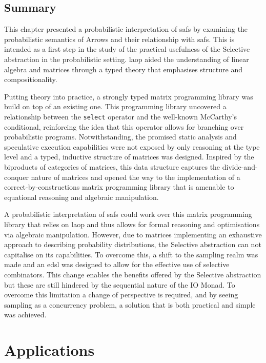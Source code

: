 \documentclass[
  oneside,
  11pt, a4paper,
  footinclude=true,
  headinclude=true,
  cleardoublepage=empty
]{scrbook}
\theoremstyle{definition}
\theoremstyle{definition}
\begin{document}
    \section{Summary}
    
    This chapter presented a probabilistic interpretation of \glspl{saf} by examining the probabilistic semantics of Arrows and their relationship with \glspl{saf}. This is intended as a first step in the study of the practical usefulness of the Selective abstraction in the probabilistic setting. \gls{laop} aided the understanding of linear algebra and matrices through a typed theory that emphasises structure and compositionality.
    
    Putting theory into practice, a strongly typed matrix programming library was build on top of an existing one. This programming library uncovered a relationship between the \texttt{select} operator and the well-known McCarthy's conditional, reinforcing the idea that this operator allows for branching over probabilistic programs. Notwithstanding, the promised static analysis and speculative execution capabilities were not exposed by only reasoning at the type level and a typed, inductive structure of matrices was designed. Inspired by the biproducts of categories of matrices, this data structure captures the divide-and-conquer nature of matrices and opened the way to the implementation of a correct-by-constructions matrix programming library that is amenable to equational reasoning and algebraic manipulation. 
    
    A probabilistic interpretation of \glspl{saf} could work over this matrix programming library that relies on \gls{laop} and thus allows for formal reasoning and optimisations via algebraic manipulation. However, due to matrices implementing an exhaustive approach to describing probability distributions, the Selective abstraction can not capitalise on its capabilities. To overcome this, a shift to the sampling realm was made and an \gls{edsl} was designed to allow for the effective use of selective combinators. This change enables the benefits offered by the Selective abstraction but these are still hindered by the sequential nature of the IO Monad. To overcome this limitation a change of perspective is required, and by seeing sampling as a concurrency problem, a solution that is both practical and simple was achieved.
    
    \chapter{Applications}\label{ch-applications}
   
\end{document}
